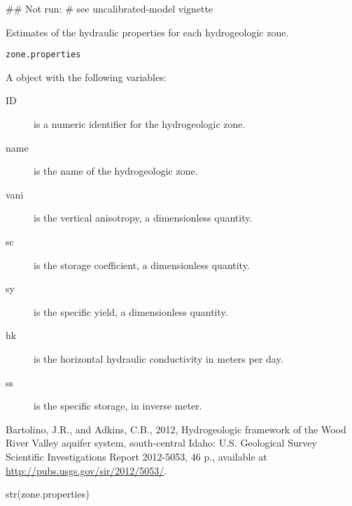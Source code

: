 \documentclass[letterpaper]{book}
\begin{document}
%
\begin{Examples}
\begin{ExampleCode}
## Not run: # see uncalibrated-model vignette
\end{ExampleCode}
\end{Examples}
%
\begin{Description}\relax
Estimates of the hydraulic properties for each hydrogeologic zone.
\end{Description}
%
\begin{Usage}
\begin{verbatim}
zone.properties
\end{verbatim}
\end{Usage}
%
\begin{Format}
A  object with the following variables:
\begin{description}

\item[ID] is a numeric identifier for the hydrogeologic zone.
\item[name] is the name of the hydrogeologic zone.
\item[vani] is the vertical anisotropy, a dimensionless quantity.
\item[sc] is the storage coefficient, a dimensionless quantity.
\item[sy] is the specific yield, a dimensionless quantity.
\item[hk] is the horizontal hydraulic conductivity in meters per day.
\item[ss] is the specific storage, in inverse meter.

\end{description}

\end{Format}
%
\begin{Source}\relax
Bartolino, J.R., and Adkins, C.B., 2012, Hydrogeologic framework of the Wood River Valley aquifer system, south-central Idaho: U.S. Geological Survey Scientific Investigations Report 2012-5053, 46 p., available at \url{http://pubs.usgs.gov/sir/2012/5053/}.
\end{Source}
%
\begin{Examples}
\begin{ExampleCode}
str(zone.properties)
\end{ExampleCode}
\end{Examples}
\printindex{}
\end{document}
